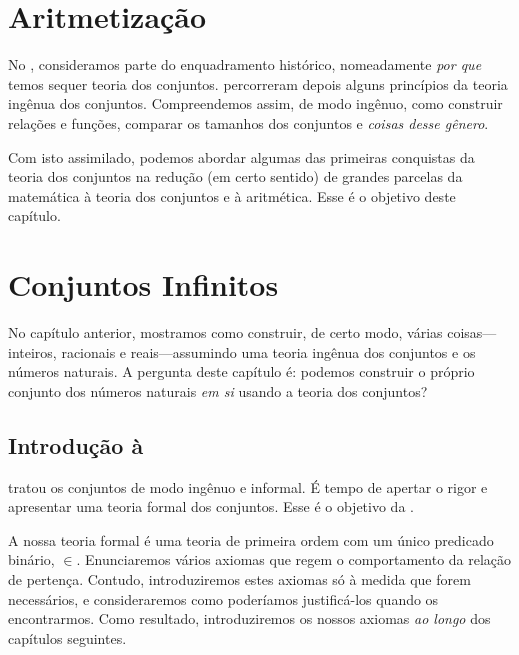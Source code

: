\endgroup

\OLEndChapterHook

\chapter{Aritmetização}

No , consideramos parte do enquadramento
histórico, nomeadamente \emph{por que} temos sequer teoria dos
conjuntos.
 percorreram depois alguns
princípios da teoria ingênua dos conjuntos. Compreendemos assim, de
modo ingênuo, como construir relações e funções, comparar os tamanhos
dos conjuntos e \emph{coisas desse gênero}.

Com isto assimilado, podemos abordar algumas das primeiras conquistas
da teoria dos conjuntos na redução (em certo sentido) de grandes
parcelas da matemática à teoria dos conjuntos e à aritmética. Esse é o
objetivo deste capítulo.


\chapter{Conjuntos Infinitos}

No capítulo anterior, mostramos como construir, de certo modo, várias
coisas---inteiros, racionais e reais---assumindo uma teoria ingênua dos
conjuntos e os números naturais. A pergunta deste capítulo é: podemos
construir o próprio conjunto dos números naturais \emph{em si} usando a
teoria dos conjuntos?

\olresetchapter

\OLEndPartHook


\section*{Introdução à }

 tratou os conjuntos de modo ingênuo e informal. É
tempo de apertar o rigor e apresentar uma teoria formal dos conjuntos.
Esse é o objetivo da .

A nossa teoria formal é uma teoria de primeira ordem com um único
predicado binário, $\in$. Enunciaremos vários axiomas que regem o
comportamento da relação de pertença. Contudo, introduziremos estes
axiomas só à medida que forem necessários, e consideraremos como
poderíamos justificá-los quando os encontrarmos. Como resultado,
introduziremos os nossos axiomas \emph{ao longo} dos capítulos
seguintes.

